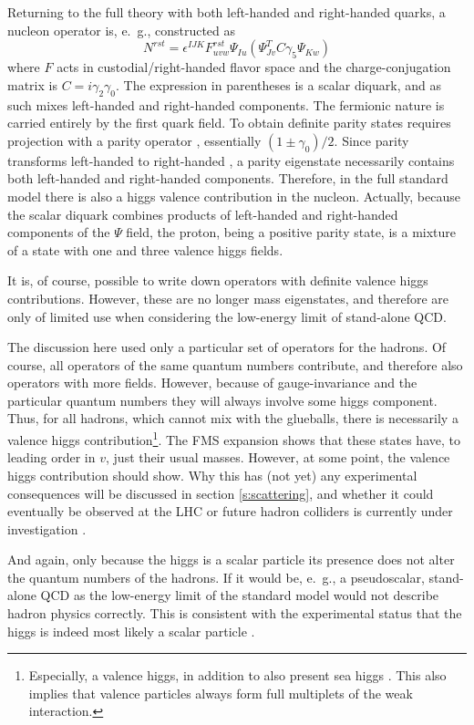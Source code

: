 \documentclass[final,12pt]{article}
\newcommand*{\no}{\noindent}
\newcommand*{\be}{\begin{equation}}
\newcommand*{\ee}{\end{equation}}
\newcommand*{\1}{1\!\!\!\bot}
\begin{document}
Returning to the full theory with both left-handed and right-handed quarks, a nucleon operator is, e.\ g., constructed as \cite{Gattringer:2010zz}
\be
N^{rst}=\epsilon^{IJK}F^{rst}_{uvw}\Psi_{Iu}\left(\Psi^T_{Jv}C\gamma_5\Psi_{Kw}\right)\label{nucleon}
\ee
\no where $F$ acts in custodial/right-handed flavor space and the charge-conjugation matrix is $C=i\gamma_2\gamma_0$. The expression in parentheses is a scalar diquark, and as such mixes left-handed and right-handed components. The fermionic nature is carried entirely by the first quark field. To obtain definite parity states requires projection with a parity operator \cite{Gattringer:2010zz}, essentially $(1\pm\gamma_0)/2$. Since parity transforms left-handed to right-handed \cite{Itzykson:1980rh}, a parity eigenstate necessarily contains both left-handed and right-handed components. Therefore, in the full standard model there is also a higgs valence contribution in the nucleon. Actually, because the scalar diquark combines products of left-handed and right-handed components of the $\Psi$ field, the proton, being a positive parity state, is a mixture of a state with one and three valence higgs fields.

It is, of course, possible to write down operators with definite valence higgs contributions. However, these are no longer mass eigenstates, and therefore are only of limited use when considering the low-energy limit of stand-alone QCD.

The discussion here used only a particular set of operators for the hadrons. Of course, all operators of the same quantum numbers contribute, and therefore also operators with more fields. However, because of gauge-invariance and the particular quantum numbers they will always involve some higgs component. Thus, for all hadrons, which cannot mix with the glueballs, there is necessarily a valence higgs contribution\footnote{Especially, a valence higgs, in addition to also present sea higgs \cite{Bauer:2017isx,Bauer:2018arx,Bauer:2018xag}. This also implies that valence particles always form full multiplets of the weak interaction.}. The FMS expansion shows that these states have, to leading order in $v$, just their usual masses. However, at some point, the valence higgs contribution should show. Why this has (not yet) any experimental consequences will be discussed in section \ref{s:scattering}, and whether it could eventually be observed at the LHC or future hadron colliders is currently under investigation \cite{Fernbach:unpublished}.

And again, only because the higgs is a scalar particle its presence does not alter the quantum numbers of the hadrons. If it would be, e.\ g., a pseudoscalar, stand-alone QCD as the low-energy limit of the standard model would not describe hadron physics correctly. This is consistent with the experimental status that the higgs is indeed most likely a scalar particle \cite{Aad:2015mxa,Aad:2013xqa,pdg}.
\end{document}
